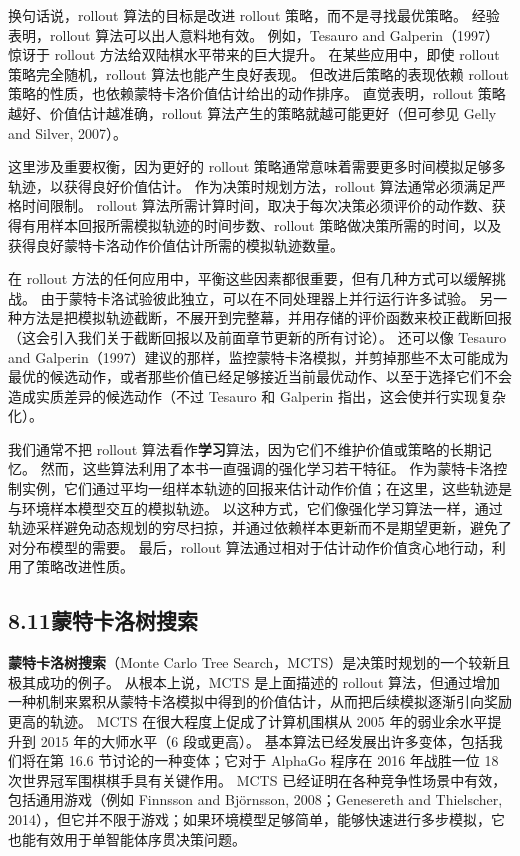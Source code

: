 \documentclass[UTF8, 12pt, fontset=fandol, oneside]{ctexart}
\begin{document}
换句话说，rollout 算法的目标是改进 rollout 策略，而不是寻找最优策略。
经验表明，rollout 算法可以出人意料地有效。
例如，Tesauro and Galperin（1997）惊讶于 rollout 方法给双陆棋水平带来的巨大提升。
在某些应用中，即使 rollout 策略完全随机，rollout 算法也能产生良好表现。
但改进后策略的表现依赖 rollout 策略的性质，也依赖蒙特卡洛价值估计给出的动作排序。
直觉表明，rollout 策略越好、价值估计越准确，rollout 算法产生的策略就越可能更好（但可参见 Gelly and Silver, 2007）。

这里涉及重要权衡，因为更好的 rollout 策略通常意味着需要更多时间模拟足够多轨迹，以获得良好价值估计。
作为决策时规划方法，rollout 算法通常必须满足严格时间限制。
rollout 算法所需计算时间，取决于每次决策必须评价的动作数、获得有用样本回报所需模拟轨迹的时间步数、rollout 策略做决策所需的时间，以及获得良好蒙特卡洛动作价值估计所需的模拟轨迹数量。

在 rollout 方法的任何应用中，平衡这些因素都很重要，但有几种方式可以缓解挑战。
由于蒙特卡洛试验彼此独立，可以在不同处理器上并行运行许多试验。
另一种方法是把模拟轨迹截断，不展开到完整幕，并用存储的评价函数来校正截断回报（这会引入我们关于截断回报以及前面章节更新的所有讨论）。
还可以像 Tesauro and Galperin（1997）建议的那样，监控蒙特卡洛模拟，并剪掉那些不太可能成为最优的候选动作，或者那些价值已经足够接近当前最优动作、以至于选择它们不会造成实质差异的候选动作（不过 Tesauro 和 Galperin 指出，这会使并行实现复杂化）。

我们通常不把 rollout 算法看作\textbf{学习}算法，因为它们不维护价值或策略的长期记忆。
然而，这些算法利用了本书一直强调的强化学习若干特征。
作为蒙特卡洛控制实例，它们通过平均一组样本轨迹的回报来估计动作价值；在这里，这些轨迹是与环境样本模型交互的模拟轨迹。
以这种方式，它们像强化学习算法一样，通过轨迹采样避免动态规划的穷尽扫掠，并通过依赖样本更新而不是期望更新，避免了对分布模型的需要。
最后，rollout 算法通过相对于估计动作价值贪心地行动，利用了策略改进性质。

\subsection*{8.11\quad 蒙特卡洛树搜索}

\textbf{蒙特卡洛树搜索}（Monte Carlo Tree Search，MCTS）是决策时规划的一个较新且极其成功的例子。
从根本上说，MCTS 是上面描述的 rollout 算法，但通过增加一种机制来累积从蒙特卡洛模拟中得到的价值估计，从而把后续模拟逐渐引向奖励更高的轨迹。
MCTS 在很大程度上促成了计算机围棋从 2005 年的弱业余水平提升到 2015 年的大师水平（6 段或更高）。
基本算法已经发展出许多变体，包括我们将在第 16.6 节讨论的一种变体；它对于 AlphaGo 程序在 2016 年战胜一位 18 次世界冠军围棋棋手具有关键作用。
MCTS 已经证明在各种竞争性场景中有效，包括通用游戏（例如 Finnsson and Björnsson, 2008；Genesereth and Thielscher, 2014），但它并不限于游戏；如果环境模型足够简单，能够快速进行多步模拟，它也能有效用于单智能体序贯决策问题。
\end{document}
